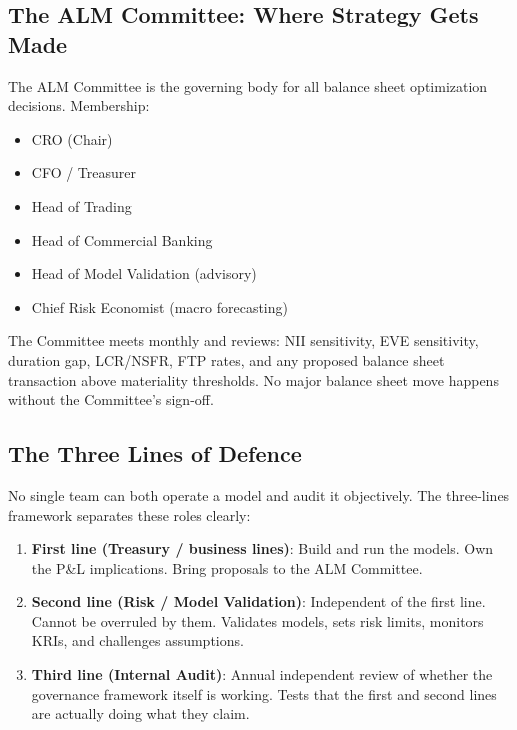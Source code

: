 \documentclass[12pt,a4paper]{article}
\begin{document}
\subsection{The ALM Committee: Where Strategy Gets Made}

The ALM Committee is the governing body for all balance sheet optimization
decisions.  Membership:

\begin{itemize}[noitemsep]
  \item CRO (Chair)
  \item CFO / Treasurer
  \item Head of Trading
  \item Head of Commercial Banking
  \item Head of Model Validation (advisory)
  \item Chief Risk Economist (macro forecasting)
\end{itemize}

The Committee meets monthly and reviews: NII sensitivity, EVE sensitivity,
duration gap, LCR/NSFR, FTP rates, and any proposed balance sheet
transaction above materiality thresholds.  No major balance sheet move
happens without the Committee's sign-off.

\subsection{The Three Lines of Defence}

No single team can both operate a model and audit it objectively.
The three-lines framework separates these roles clearly:

\begin{enumerate}[noitemsep]
  \item \textbf{First line (Treasury / business lines)}: Build and run the
        models.  Own the P\&L implications.  Bring proposals to the ALM
        Committee.
  \item \textbf{Second line (Risk / Model Validation)}: Independent of the
        first line.  Cannot be overruled by them.  Validates models, sets
        risk limits, monitors KRIs, and challenges assumptions.
  \item \textbf{Third line (Internal Audit)}: Annual independent review of
        whether the governance framework itself is working.  Tests that the
        first and second lines are actually doing what they claim.
\end{enumerate}

\end{document}

